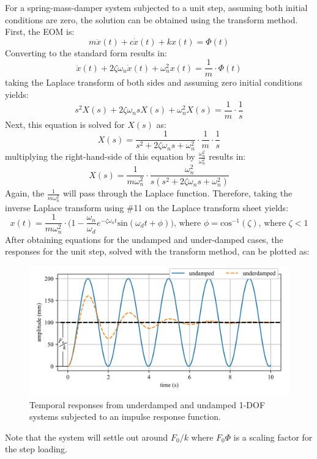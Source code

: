 \documentclass[12pt,letter]{article}
\begin{document}
For a spring-mass-damper system subjected to a unit step, assuming both initial conditions are zero, the solution can be obtained using the transform method. First, the EOM is:
\begin{equation}
m\ddot{x}(t) + c\dot{x}(t) + kx(t) = \Phi(t)
\end{equation}
Converting to the standard form results in:
\begin{equation}
\ddot{x}(t) + 2  \zeta \omega_n\dot{x}(t) + \omega_n^2x(t) = \frac{1}{m} \cdot \Phi(t)
\end{equation}
taking the Laplace transform of both sides and assuming zero initial conditions yields:
\begin{equation}
	s^2X(s) + 2  \zeta \omega_n s X(s) + \omega_n^2 X(s)  =\frac{1}{m} \cdot \frac{1}{s}
\end{equation}
Next, this equation is solved for $X(s)$ as:
\begin{equation}
	X(s) = \frac{1}{s^2 + 2  \zeta \omega_n s + \omega_n^2} \cdot \frac{1}{m} \cdot \frac{1}{s}
\end{equation}
multiplying the right-hand-side of this equation by  $\frac{\omega_n^2}{\omega_n^2}$ results in:
\begin{equation}
	X(s) = \frac{1}{m \omega_n^2} \cdot \frac{\omega_n^2}{s(s^2+2\zeta\omega_n s+\omega_n^2)}
\end{equation}
Again, the $\frac{1}{m\omega_n^2}$ will pass through the Laplace function. Therefore, taking the inverse Laplace transform using \#11 on the Laplace transform sheet yields:
\begin{equation}
	x(t) = \frac{1}{m \omega_n^2} \cdot \Big(1 - \frac{\omega_n}{\omega_d}e^{-\zeta \omega_n t}\text{sin}(\omega_dt + \phi)\Big)\text{, where } \phi = \text{cos}^{-1}(\zeta)\text{, where } \zeta<1
\end{equation}
After obtaining equations for the undamped and under-damped cases, the responses for the unit step, solved with the transform method, can be plotted as:
\begin{figure}[H]
	\centering
	\includegraphics[]{../figures/response_unit_step.png}
	\caption{Temporal responses from underdamped and undamped 1-DOF systems subjected to an impulse response function.}
\end{figure}
Note that the system will settle out around $F_0/k$ where $F_0  \Phi$ is a scaling factor for the step loading.
\end{document}
